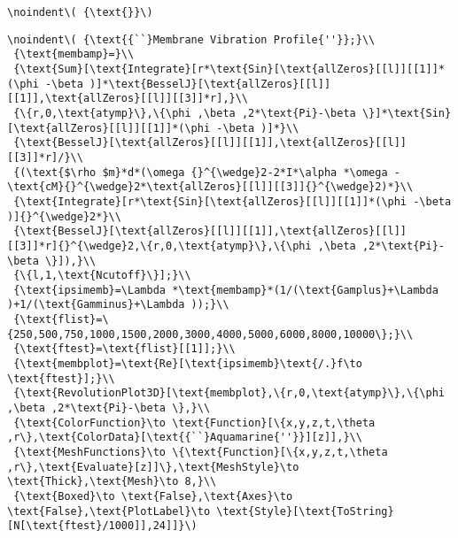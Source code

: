 \begin{appendix}
\begin{verbatim}
\noindent\( {\text{}}\)
\end{verbatim}

\begin{verbatim}
\noindent\( {\text{{``}Membrane Vibration Profile{''}};}\\
 {\text{membamp}=}\\
 {\text{Sum}[\text{Integrate}[r*\text{Sin}[\text{allZeros}[[l]][[1]]*(\phi -\beta )]*\text{BesselJ}[\text{allZeros}[[l]][[1]],\text{allZeros}[[l]][[3]]*r],}\\
 {\{r,0,\text{atymp}\},\{\phi ,\beta ,2*\text{Pi}-\beta \}]*\text{Sin}[\text{allZeros}[[l]][[1]]*(\phi -\beta )]*}\\
 {\text{BesselJ}[\text{allZeros}[[l]][[1]],\text{allZeros}[[l]][[3]]*r]/}\\
 {(\text{$\rho $m}*d*(\omega {}^{\wedge}2-2*I*\alpha *\omega -\text{cM}{}^{\wedge}2*\text{allZeros}[[l]][[3]]{}^{\wedge}2)*}\\
 {\text{Integrate}[r*\text{Sin}[\text{allZeros}[[l]][[1]]*(\phi -\beta )]{}^{\wedge}2*}\\
 {\text{BesselJ}[\text{allZeros}[[l]][[1]],\text{allZeros}[[l]][[3]]*r]{}^{\wedge}2,\{r,0,\text{atymp}\},\{\phi ,\beta ,2*\text{Pi}-\beta \}]),}\\
 {\{l,1,\text{Ncutoff}\}];}\\
 {\text{ipsimemb}=\Lambda *\text{membamp}*(1/(\text{Gamplus}+\Lambda )+1/(\text{Gamminus}+\Lambda ));}\\
 {\text{flist}=\{250,500,750,1000,1500,2000,3000,4000,5000,6000,8000,10000\};}\\
 {\text{ftest}=\text{flist}[[1]];}\\
 {\text{membplot}=\text{Re}[\text{ipsimemb}\text{/.}f\to \text{ftest}];}\\
 {\text{RevolutionPlot3D}[\text{membplot},\{r,0,\text{atymp}\},\{\phi ,\beta ,2*\text{Pi}-\beta \},}\\
 {\text{ColorFunction}\to \text{Function}[\{x,y,z,t,\theta ,r\},\text{ColorData}[\text{{``}Aquamarine{''}}][z]],}\\
 {\text{MeshFunctions}\to \{\text{Function}[\{x,y,z,t,\theta ,r\},\text{Evaluate}[z]]\},\text{MeshStyle}\to \text{Thick},\text{Mesh}\to 8,}\\
 {\text{Boxed}\to \text{False},\text{Axes}\to \text{False},\text{PlotLabel}\to \text{Style}[\text{ToString}[N[\text{ftest}/1000]],24]]}\)
\end{verbatim}
\end{appendix}
